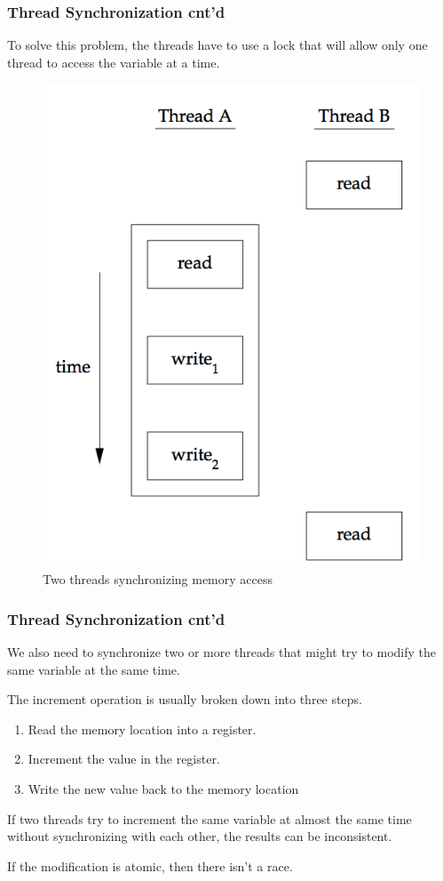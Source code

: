 \documentclass[newPxFont,sthlmFooter,nooffset]{beamer}
\begin{document}
\begin{frame}[t]
  \frametitle{Thread Synchronization cnt'd}
To solve this problem, the threads have to use a lock that will allow only one thread to access the variable at a time. 

  \begin{figure}[h]
    \centering
    \includegraphics[width=0.4\linewidth]{figure/fig11-8}
    \caption{Two threads synchronizing memory access}
    \label{fig:work}
  \end{figure}  


\end{frame}




\begin{frame}[t]
  \frametitle{Thread Synchronization cnt'd}
We also need to synchronize two or more threads that might try to modify the same variable at the same time.

The increment operation is usually broken down into three steps.
\begin{enumerate}
\item  Read the memory location into a register.
\item  Increment the value in the register.
\item  Write the new value back to the memory location
\end{enumerate}

If two threads try to increment the same variable at almost the same time without synchronizing with each other, the results can be inconsistent. 

If the modification is atomic, then there isn’t a race. 

\end{frame}
\end{document}
